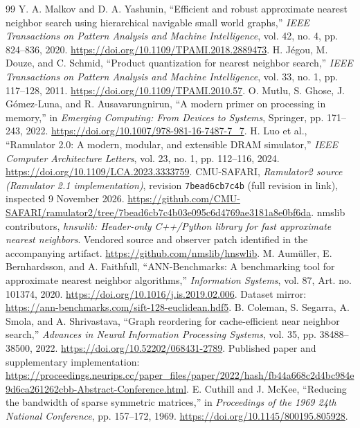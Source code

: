 \begin{thebibliography}{99}
 Y. A. Malkov and D. A. Yashunin, ``Efficient and robust approximate nearest neighbor search using hierarchical navigable small world graphs,'' \emph{IEEE Transactions on Pattern Analysis and Machine Intelligence}, vol. 42, no. 4, pp. 824--836, 2020. \url{https://doi.org/10.1109/TPAMI.2018.2889473}.
 H. J\'egou, M. Douze, and C. Schmid, ``Product quantization for nearest neighbor search,'' \emph{IEEE Transactions on Pattern Analysis and Machine Intelligence}, vol. 33, no. 1, pp. 117--128, 2011. \url{https://doi.org/10.1109/TPAMI.2010.57}.
 O. Mutlu, S. Ghose, J. G\'omez-Luna, and R. Ausavarungnirun, ``A modern primer on processing in memory,'' in \emph{Emerging Computing: From Devices to Systems}, Springer, pp. 171--243, 2022. \url{https://doi.org/10.1007/978-981-16-7487-7_7}.
 H. Luo et al., ``Ramulator 2.0: A modern, modular, and extensible DRAM simulator,'' \emph{IEEE Computer Architecture Letters}, vol. 23, no. 1, pp. 112--116, 2024. \url{https://doi.org/10.1109/LCA.2023.3333759}.
 CMU-SAFARI, \emph{Ramulator2 source (Ramulator 2.1 implementation)}, revision \texttt{7bead6cb7c4b} (full revision in link), inspected 9 November 2026. \url{https://github.com/CMU-SAFARI/ramulator2/tree/7bead6cb7c4b03e095c6d4769ae3181a8e0bf6da}.
 nmslib contributors, \emph{hnswlib: Header-only C++/Python library for fast approximate nearest neighbors}. Vendored source and observer patch identified in the accompanying artifact. \url{https://github.com/nmslib/hnswlib}.
 M. Aum\"uller, E. Bernhardsson, and A. Faithfull, ``ANN-Benchmarks: A benchmarking tool for approximate nearest neighbor algorithms,'' \emph{Information Systems}, vol. 87, Art. no. 101374, 2020. \url{https://doi.org/10.1016/j.is.2019.02.006}. Dataset mirror: \url{https://ann-benchmarks.com/sift-128-euclidean.hdf5}.
 B. Coleman, S. Segarra, A. Smola, and A. Shrivastava, ``Graph reordering for cache-efficient near neighbor search,'' \emph{Advances in Neural Information Processing Systems}, vol. 35, pp. 38488--38500, 2022. \url{https://doi.org/10.52202/068431-2789}. Published paper and supplementary implementation: \url{https://proceedings.neurips.cc/paper_files/paper/2022/hash/fb44a668c2d4bc984e9d6ca261262cbb-Abstract-Conference.html}.
 E. Cuthill and J. McKee, ``Reducing the bandwidth of sparse symmetric matrices,'' in \emph{Proceedings of the 1969 24th National Conference}, pp. 157--172, 1969. \url{https://doi.org/10.1145/800195.805928}.

\end{thebibliography}
